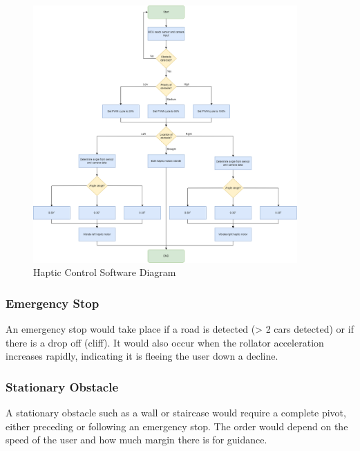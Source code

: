 \begin{figure}[H]
	\centering
	\includegraphics[width=0.9\textwidth]{./Images/hapticsw.png}
	\caption{\label{fig:hapticsw}Haptic Control Software Diagram}
\end{figure}

\subsubsection{Emergency Stop}
\noindent An emergency stop would take place if a road is detected (> 2 cars detected) or if there is a drop off (cliff). It would also occur when the rollator acceleration increases rapidly, indicating it is fleeing the user down a decline.\\

\subsubsection{Stationary Obstacle}
\noindent A stationary obstacle such as a wall or staircase would require a complete pivot, either preceding or following an emergency stop. The order would depend on the speed of the user and how much margin there is for guidance.\\


